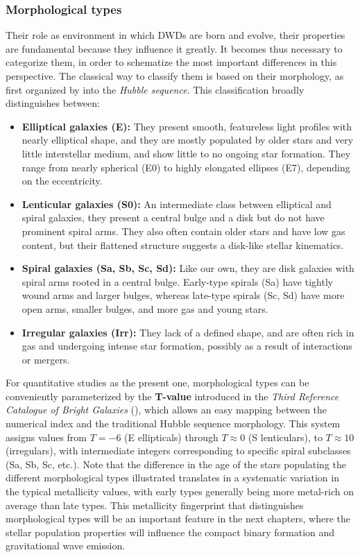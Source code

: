 \subsubsection{Morphological types}
Their role as environment in which DWDs are born and evolve, their properties are fundamental because they influence it greatly.
It becomes thus necessary to categorize them, in order to schematize the most important differences in this perspective.
The classical way to classify them is based on their morphology, as first organized by \citet{Hubble1926} into the \textit{Hubble sequence}.  
This classification broadly distinguishes between:
\begin{itemize}
    \item \textbf{Elliptical galaxies (E):} They present smooth, featureless light profiles with nearly elliptical shape, and they are mostly populated by older stars and very little interstellar medium, and show little to no ongoing star formation. 
    They range from nearly spherical (E0) to highly elongated ellipses (E7), depending on the eccentricity. 
    \item \textbf{Lenticular galaxies (S0):} An intermediate class between elliptical and spiral galaxies, they present a central bulge and a disk but do not have prominent spiral arms.
    They also often contain older stars and have low gas content, but their flattened structure suggests a disk-like stellar kinematics.
    \item \textbf{Spiral galaxies (Sa, Sb, Sc, Sd):} Like our own, they are disk galaxies with spiral arms rooted in a central bulge.
    Early-type spirals (Sa) have tightly wound arms and larger bulges, whereas late-type spirals (Sc, Sd) have more open arms, smaller bulges, and more gas and young stars.
    \item \textbf{Irregular galaxies (Irr):} They lack of a defined shape, and are often rich in gas and undergoing intense star formation, possibly as a result of interactions or mergers.
\end{itemize}
For quantitative studies as the present one, morphological types can be conveniently parameterized by the \textbf{T-value} introduced in the \textit{Third Reference Catalogue of Bright Galaxies} (\citealt{Vaculeurs}), which allows an easy mapping between the numerical index and the traditional Hubble sequence morphology.
This system assigns values from $T=-6$ (E ellipticals) through $T\approx 0$ (S lenticulars), to $T\approx 10$ (irregulars), with intermediate integers corresponding to specific spiral subclasses (Sa, Sb, Sc, etc.).  
Note that the difference in the age of the stars populating the different morphological types illustrated translates in a systematic variation in the typical metallicity values, with early types generally being more metal-rich on average than late types. 
This metallicity fingerprint that distinguishes morphological types will be an important feature in the next chapters, where the stellar population properties will influence the compact binary formation and gravitational wave emission.

